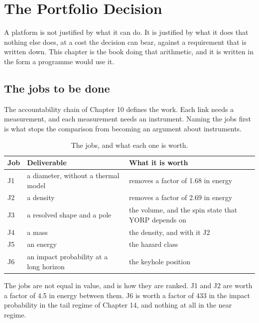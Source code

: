 
\chapter{The Portfolio Decision}
\label{ch:portfolio}

A platform is not justified by what it can do. It is justified by what it
does that nothing else does, at a cost the decision can bear, against a
requirement that is written down. This chapter is the book doing that
arithmetic, and it is written in the form a programme would use it.

\section{The jobs to be done}

The accountability chain of Chapter 10 defines the work. Each link needs a
measurement, and each measurement needs an instrument. Naming the jobs
first is what stops the comparison from becoming an argument about
instruments.

\begin{table}[!htbp]
\centering
\small
\caption{The jobs, and what each one is worth.}
\label{tab:jobs}
\begin{tabularx}{\textwidth}{@{}P{0.78in}P{1.78in}Y@{}}
\toprule
{}
\textbf{Job} & \textbf{Deliverable} & \textbf{What it is worth} \\
\midrule
J1 & a diameter, without a thermal model & removes a factor of 1.68 in
energy \\
J2 & a density & removes a factor of 2.69 in energy \\
J3 & a resolved shape and a pole & the volume, and the spin state that
YORP depends on \\
J4 & a mass & the density, and with it J2 \\
J5 & an energy & the hazard class \\
J6 & an impact probability at a long horizon & the keyhole position \\
\bottomrule
\end{tabularx}
\end{table}

The jobs are not equal in value, and  is how they are
ranked. J1 and J2 are worth a factor of 4.5 in energy between them. J6 is
worth a factor of 433 in the impact probability in the tail regime of
Chapter 14, and nothing at all in the near regime.


